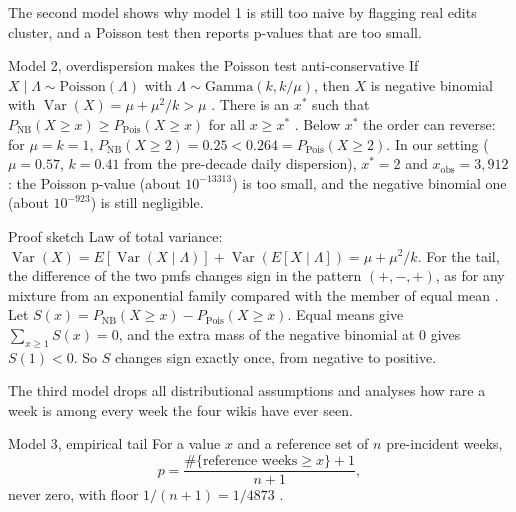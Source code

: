 \documentclass[10pt,a4paper]{article}
\begin{document}
The second model shows why model 1 is still too naive by flagging real edits cluster, and a Poisson test then reports p-values that are too small.
\begin{resbox}{Model 2, overdispersion makes the Poisson test anti-conservative}
If $X \mid \Lambda \sim \mathrm{Poisson}(\Lambda)$ with $\Lambda \sim \mathrm{Gamma}(k, k/\mu)$, then $X$ is negative binomial with
$\operatorname{Var}(X) = \mu + \mu^2/k > \mu$ \citep[\S17.2]{gelman2013bda}. There is an $x^*$ such that $P_{\mathrm{NB}}(X \ge x) \ge P_{\mathrm{Pois}}(X \ge x)$ for all $x \ge x^*$ \citep{shaked1980mixtures}. Below $x^*$ the order can reverse: for $\mu = k = 1$, $P_{\mathrm{NB}}(X \ge 2) = 0.25 < 0.264 = P_{\mathrm{Pois}}(X \ge 2)$.
In our setting ($\mu = 0.57$, $k = 0.41$ from the pre-decade daily dispersion), $x^* = 2$ and $x_{\mathrm{obs}} = 3{,}912$: the Poisson p-value (about $10^{-13313}$) is too small, and the negative binomial one (about $10^{-923}$) is still negligible.
\end{resbox}
\begin{proofbox}{Proof sketch}
Law of total variance: $\operatorname{Var}(X) = E[\operatorname{Var}(X\mid\Lambda)] + \operatorname{Var}(E[X\mid\Lambda]) = \mu + \mu^2/k$. For the tail, the difference of the two pmfs changes sign in the pattern $(+,-,+)$, as for any mixture from an exponential family compared with the member of equal mean \citep{shaked1980mixtures}. Let $S(x) = P_{\mathrm{NB}}(X \ge x) - P_{\mathrm{Pois}}(X \ge x)$. Equal means give $\sum_{x \ge 1} S(x) = 0$, and the extra mass of the negative binomial at 0 gives $S(1) < 0$. So $S$ changes sign exactly once, from negative to positive.
\end{proofbox}

The third model drops all distributional assumptions and analyses how rare a week is among every week the four wikis have ever seen.
\begin{defbox}{Model 3, empirical tail}
For a value $x$ and a reference set of $n$ pre-incident weeks,
$$p = \frac{\#\{\text{reference weeks} \ge x\} + 1}{n + 1},$$
never zero, with floor $1/(n+1) = 1/4873$ \citep{phipson2010permutation}.
\end{defbox}
\end{document}
